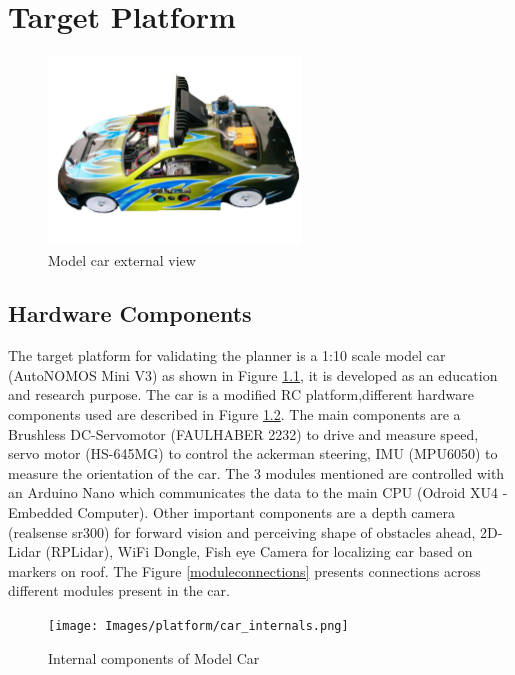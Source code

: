 \chapter{Target Platform}
\label{vehicle_info}

\begin{figure}[H]
	\centering
	\includegraphics[width=0.6\textwidth]{Images/platform/car.jpg}
	\caption{Model car external view}
	\label{model_car}
\end{figure}

\section{Hardware Components}
The target platform for validating the planner is a 1:10 scale model car (AutoNOMOS Mini V3) as shown in Figure \ref{model_car}, it is developed as an education and research purpose. The car is a modified RC platform,different hardware components used are described in Figure \ref{internalcar}. The main components are a Brushless DC-Servomotor (FAULHABER 2232) to drive and measure speed, servo
motor (HS-645MG) to control the ackerman steering, IMU (MPU6050) to measure the orientation of the car. The 3 modules mentioned are controlled with an Arduino Nano which communicates the data to the main CPU (Odroid XU4 -  Embedded Computer). Other important components are a depth camera (realsense sr300) for forward vision and perceiving shape of obstacles ahead, 2D-Lidar (RPLidar), WiFi Dongle,  Fish eye Camera for localizing car based on markers on roof. The Figure \ref{moduleconnections} presents connections across different modules present in the car.

\begin{figure}
	\centering
	\texttt{[image: Images/platform/car\_internals.png]}
	\caption{Internal components of Model Car}
	\label{internalcar}
\end{figure}

